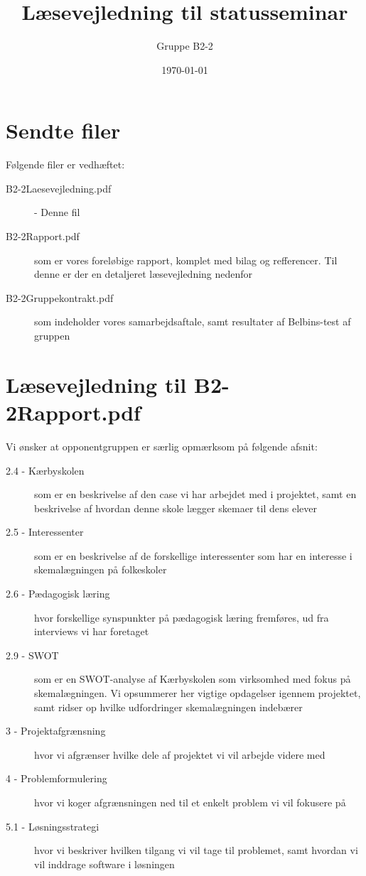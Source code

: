 \documentclass{article}
\begin{document}
\title{Læsevejledning til statusseminar}
\author{Gruppe B2-2}
\date{\today}
\maketitle

\section*{Sendte filer}
Følgende filer er vedhæftet:
\begin{description}
	\item[B2-2\textunderscore Laesevejledning.pdf] - Denne fil
	\item[B2-2\textunderscore Rapport.pdf] som er vores foreløbige rapport, komplet med bilag og refferencer. Til denne er der en detaljeret læsevejledning nedenfor
	\item[B2-2\textunderscore Gruppekontrakt.pdf] som indeholder vores samarbejdsaftale, samt resultater af Belbins-test af gruppen
\end{description}

\section*{Læsevejledning til B2-2\textunderscore Rapport.pdf}
Vi ønsker at opponentgruppen er særlig opmærksom på følgende afsnit:
\begin{description}
	\item[2.4 - Kærbyskolen] som er en beskrivelse af den case vi har arbejdet med i projektet, samt en beskrivelse af hvordan denne skole lægger skemaer til dens elever
	\item[2.5 - Interessenter] som er en beskrivelse af de forskellige interessenter som har en interesse i skemalægningen på folkeskoler
	\item[2.6 - Pædagogisk læring] hvor forskellige synspunkter på pædagogisk læring fremføres, ud fra interviews vi har foretaget
	\item[2.9 - SWOT] som er en SWOT-analyse af Kærbyskolen som virksomhed med fokus på skemalægningen. Vi opsummerer her vigtige opdagelser igennem projektet, samt ridser op hvilke udfordringer skemalægningen indebærer
	\item[3 - Projektafgrænsning] hvor vi afgrænser hvilke dele af projektet vi vil arbejde videre med
	\item[4 - Problemformulering] hvor vi koger afgrænsningen ned til et enkelt problem vi vil fokusere på
	\item[5.1 - Løsningsstrategi] hvor vi beskriver hvilken tilgang vi vil tage til problemet, samt hvordan vi vil inddrage software i løsningen
\end{description} 
\end{document}
